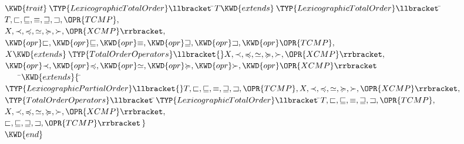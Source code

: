 \begin{Fortress}
\(\KWD{trait}\:\TYP{LexicographicTotalOrder}\llbracket\,\null\)\pushtabs\=\+\(T \KWD{extends}\:\TYP{LexicographicTotalOrder}\llbracket\,\null\)\pushtabs\=\+\(T,\sqsubset,\sqsubseteq,\equiv,\sqsupseteq,\sqsupset,\OPR{TCMP},\)\\
\(                                                                  X,\prec,\preccurlyeq,\simeq,\succcurlyeq,\succ,\OPR{XCMP}\rrbracket,\)\-\\\poptabs
\(                               \KWD{opr} \mathord{\sqsubset}, \KWD{opr} \mathord{\sqsubseteq}, \KWD{opr} \mathord{\equiv}, \KWD{opr} \mathord{\sqsupseteq}, \KWD{opr} \mathord{\sqsupset}, \KWD{opr} \mathord{\OPR{TCMP}},\)\\
\(                               X \KWD{extends}\:\TYP{TotalOrderOperators}\llbracket{}X,\prec,\preccurlyeq,\simeq,\succcurlyeq,\succ,\OPR{XCMP}\rrbracket,\)\\
\(                               \KWD{opr} \mathord{\prec}, \KWD{opr} \mathord{\preccurlyeq}, \KWD{opr} \mathord{\simeq}, \KWD{opr} \mathord{\succcurlyeq}, \KWD{opr} \mathord{\succ}, \KWD{opr} \mathord{\OPR{XCMP}}\rrbracket\)\-\\\poptabs
{\tt~~~~}\pushtabs\=\+\(    \KWD{extends} \{\, \null\)\pushtabs\=\+\(\TYP{LexicographicPartialOrder}\llbracket{}T,\sqsubset,\sqsubseteq,\equiv,\sqsupseteq,\sqsupset,\OPR{TCMP},X,\prec,\preccurlyeq,\simeq,\succcurlyeq,\succ,\OPR{XCMP}\rrbracket,\)\\
\(              \TYP{TotalOrderOperators}\llbracket\,\null\)\pushtabs\=\+\(\TYP{LexicographicTotalOrder}\llbracket\,\null\)\pushtabs\=\+\(T,\sqsubset,\sqsubseteq,\equiv,\sqsupseteq,\sqsupset,\OPR{TCMP},\)\\
\(                                                            X,\prec,\preccurlyeq,\simeq,\succcurlyeq,\succ,\OPR{XCMP}\rrbracket,\)\-\\\poptabs
\(                                   \sqsubset,\sqsubseteq,\sqsupseteq,\sqsupset,\OPR{TCMP}\rrbracket\,\}\)\-\-\-\\\poptabs\poptabs\poptabs
\(\KWD{end}\)
\end{Fortress}
